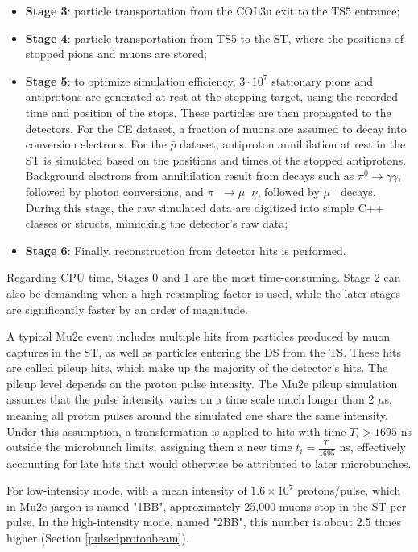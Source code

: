\begin{itemize}
    \item \textbf{Stage 3}: particle transportation from the COL3u exit to the TS5 entrance;

    \item \textbf{Stage 4}: particle transportation from TS5 to the ST, 
    where the positions of stopped pions and muons are stored;

    \item \textbf{Stage 5}: to optimize simulation efficiency, $3 \cdot 10^7$ 
    stationary pions and antiprotons are generated at rest at the stopping 
    target, using the recorded time and position of the stops. These particles 
    are then propagated to the detectors. For the CE dataset, a fraction of muons 
    are assumed to decay into conversion electrons. For the $\bar{p}$ dataset, 
    antiproton annihilation at rest in the ST is simulated based on the positions 
    and times of the stopped antiprotons. Background electrons from annihilation 
    result from decays such as $\pi^0 \to \gamma \gamma$, followed by photon 
    conversions, and $\pi^- \to \mu^- \nu$, followed by $\mu^-$ decays. During 
    this stage, the raw simulated data are digitized into simple C++ classes or 
    structs, mimicking the detector's raw data;

    \item \textbf{Stage 6}: Finally, reconstruction from detector hits is performed.
\end{itemize}

Regarding CPU time, Stages 0 and 1 are the most time-consuming. 
Stage 2 can also be demanding when a high resampling factor is used, 
while the later stages are significantly faster by an order of magnitude.

A typical Mu2e event includes multiple hits from particles produced 
by muon captures in the ST, as well as particles entering the DS from 
the TS. These hits are called pileup hits, which make 
up the majority of the detector's hits. The pileup level 
depends on the proton pulse intensity. The Mu2e pileup 
simulation assumes that the pulse intensity varies on a 
time scale much longer than 2 $\mu$s, meaning all proton 
pulses around the simulated one share the same intensity. 
Under this assumption, a transformation is applied to hits 
with time $T_i > 1695$ ns outside the microbunch limits, 
assigning them a new time $t_i = \frac{T_i}{1695}$ ns, 
effectively accounting for late hits that would otherwise 
be attributed to later microbunches. 

For low-intensity mode, with a mean intensity of 
$1.6 \times 10^7$ protons/pulse, which in Mu2e 
jargon is named "1BB", approximately 25,000 
muons stop in the ST per pulse. In the high-intensity 
mode, named "2BB", this number is about 2.5 times higher (Section \ref{pulsedprotonbeam}).


